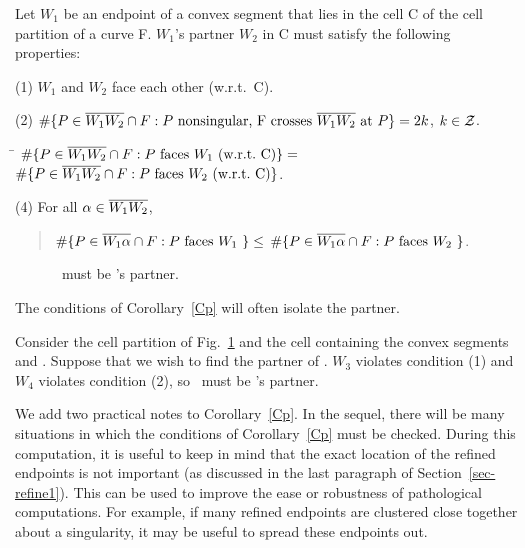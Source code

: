 \begin{corollary}
\label{Cp}
Let $W_{1}$ be an endpoint of a convex segment that lies in the cell C of the cell partition of a curve F.
$W_{1}$'s partner $W_{2}$ in C must satisfy the following properties:

{\rm (1)} $W_{1}$ and $W_{2}$ face each other {\rm (}w.r.t.\ C{\rm )}.

{\rm (2)} $\#\{P \in \mbox{$\overline{W_{1}W_{2}}$} \cap F: P \mbox{ nonsingular,
	F crosses } \mbox{$\overline{\mbox{$W_{1}$}\mbox{$W_{2}$}}$} \mbox{ at } P\} = 2k$, $k \in {\cal Z}$.

\begin{tabbing}
 \= $\#\{P \in \seg{W_{1}W_{2}} \cap F: P \mbox{ faces \wo\ 
	{\rm (}w.r.t.\ C{\rm )}}\} = $\\
\> $\#\{P \in \mbox{$\overline{W_{1}W_{2}}$} \cap F: P \mbox{ faces \mbox{$W_{2}$}\ {\rm (}w.r.t.\ C{\rm )}}\}$.
\end{tabbing}

{\rm (4)} For all $\alpha \in \mbox{$\overline{\mbox{$W_{1}$}\mbox{$W_{2}$}}$}$,\ \ \nopagebreak
\begin{quote}
	$\#\{P \in\mbox{$\overline{\mbox{$W_{1}$}\alpha}$}\cap F: P \mbox{ faces \mbox{$W_{1}$}\ }\} \leq $
	$\#\{P \in\mbox{$\overline{\mbox{$W_{1}$}\alpha}$}\cap F: P \mbox{ faces \mbox{$W_{2}$}\ }\}$.
\end{quote}
\end{corollary}

\begin{figure}[htbp]\vspace{2.25in}\caption{\wt\ must be \wo's partner.}\label{3.12}\end{figure}

\noindent The conditions of Corollary~\ref{Cp} will often isolate the partner.

\begin{example}
{\rm 
Consider the cell partition of Fig.~\ref{3.12} and the cell containing
the convex segments \arc{\wo\wt} and \arc{W_{3}W_{4}}.
Suppose that we wish to find the partner of \wo.
$W_{3}$ violates condition (1) and $W_{4}$ violates condition (2), 
so \wt\ must be \wo's partner.
}
\end{example}

We add two practical notes to Corollary~\ref{Cp}.
In the sequel,
there will be many situations in which the conditions of Corollary~\ref{Cp}
must be checked.
During this computation, it is useful to keep in mind that the exact location of the
refined endpoints is not important (as discussed in the last paragraph of
Section~\ref{sec-refine1}).
This can be used to improve the ease or robustness of pathological computations.
For example, if many refined endpoints are clustered close together about a singularity,
it may be useful to spread these endpoints out.

